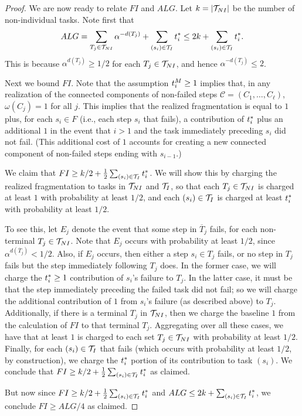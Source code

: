 \begin{proof}
    \medskip

    We are now ready to relate $FI$ and $ALG$.  
    Let $k = |\mathcal{T}_{NI}|$ be the number of non-individual tasks. 
    Note first that 
    \[ ALG = \sum_{T_j \in \mathcal{T}_{NI}} \alpha^{-d(T_j)} + \sum_{(s_i) \in \mathcal{T}_I} t^*_{i} \leq 2k + \sum_{(s_i) \in \mathcal{T}_I} t^*_{i}. \]  
    This is because $\alpha^{d(T_j)} \geq 1/2$ for each $T_j \in \mathcal{T}_{NI}$, and hence $\alpha^{-d(T_j)} \leq 2$.

    \medskip

    Next we bound $FI$.  
    Note that the assumption $t^{M}_{i} \geq 1$ implies that, in any realization of the connected components of non-failed steps $\mathcal{C} = (C_1, \dotsc, C_\ell)$, $\omega(C_j) = 1$ for all $j$. 
    This implies that the realized fragmentation is equal to $1$ plus, for each $s_i \in F$ (i.e., each step $s_i$ that fails), a contribution of $t^*_{i}$ plus an additional $1$ in the event that $i > 1$ and the task immediately preceding $s_i$ did not fail.  
    (This additional cost of $1$ accounts for creating a new connected component of non-failed steps ending with $s_{i-1}$.)
    
    We claim that $FI \geq k/2 + \frac{1}{2}\sum_{(s_i) \in \mathcal{T}_I} t^*_{i}$.  
    We will show this by charging  the realized fragmentation to tasks in $\mathcal{T}_{NI}$ and $\mathcal{T}_I$, so that each $T_j \in \mathcal{T}_{NI}$ is charged at least $1$ with probability at least $1/2$, and each $(s_i) \in \mathcal{T}_I$ is charged at least $t^*_{i}$ with probability at least $1/2$.
    
    To see this, let $E_j$ denote the event that some step in $\overline{T}_j$ fails, for each non-terminal $T_j \in \mathcal{T}_{NI}$.  
    Note that $E_j$ occurs with probability at least $1/2$, since $\alpha^{d(\overline{T}_j)} < 1/2$. 
    Also, if $E_j$ occurs, then either a step $s_i \in T_j$ fails, or no step in $T_j$ fails but the step immediately following $T_j$ does.  
    In the former case, we will charge the $t^*_{i} \geq 1$ contribution of $s_i$'s failure to $T_j$.  
    In the latter case, it must be that the step immediately preceding the failed task did not fail; so we will charge the additional contribution of $1$ from $s_i$'s failure (as described above) to $T_j$.  
    Additionally, if there is a terminal $T_j$ in $\mathcal{T}_{NI}$, then we charge the baseline $1$ from the calculation of $FI$ to that terminal $T_j$.  
    Aggregating over all these cases, we have that at least $1$ is charged to each set $T_j \in \mathcal{T}_{NI}$ with probability at least $1/2$.  
    Finally, for each $(s_i) \in \mathcal{T}_I$ that fails (which occurs with probability at least $1/2$, by construction), we charge the $t^*_{i}$ portion of its contribution to task $(s_i)$.  
    We conclude that $FI \geq k/2 + \frac{1}{2}\sum_{(s_i) \in \mathcal{T}_I}t^*_{i}$ as claimed.

    But now since $FI \geq k/2 + \frac{1}{2}\sum_{(s_i) \in \mathcal{T}_I}t^*_{i}$ and $ALG \leq 2k + \sum_{(s_i) \in \mathcal{T}_I}t^*_{i}$, we conclude $FI \geq ALG/4$ as claimed.
\end{proof}

